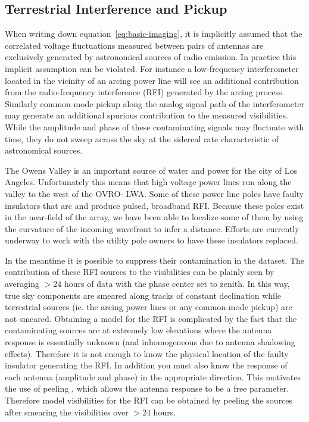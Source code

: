 \documentclass[twocolumn]{aastex6}
\begin{document}
\subsection{Terrestrial Interference and Pickup}

When writing down equation~\ref{eq:basic-imaging}, it is implicitly assumed that the correlated
voltage fluctuations measured between pairs of antennas are exclusively generated by astronomical
sources of radio emission. In practice this implicit assumption can be violated. For instance a
low-frequency interferometer located in the vicinity of an arcing power line will see an additional
contribution from the radio-frequency interference (RFI) generated by the arcing process. Similarly
common-mode pickup along the analog signal path of the interferometer may generate an additional
spurious contribution to the measured visibilities. While the amplitude and phase of these
contaminating signals may fluctuate with time, they do not sweep across the sky at the sidereal rate
characteristic of astronomical sources.

The Owens Valley is an important source of water and power for the city of Los Angeles.
Unfortunately this means that high voltage power lines run along the valley to the west of the OVRO-
LWA. Some of these power line poles have faulty insulators that arc and produce pulsed, broadband
RFI. Because these poles exist in the near-field of the array, we have been able to localize some of
them by using the curvature of the incoming wavefront to infer a distance. Efforts are currently
underway to work with the utility pole owners to have these insulators replaced.

In the meantime it is possible to suppress their contamination in the dataset. The contribution of
these RFI sources to the visibilities can be plainly seen by averaging $>24$ hours of data with the
phase center set to zenith. In this way, true sky components are smeared along tracks of constant
declination while terrestrial sources (ie. the arcing power lines or any common-mode pickup) are not
smeared.  Obtaining a model for the RFI is complicated by the fact that the contaminating sources
are at extremely low elevations where the antenna response is essentially unknown (and inhomogeneous
due to antenna shadowing effects). Therefore it is not enough to know the physical location of the
faulty insulator generating the RFI. In addition you must also know the response of each antenna
(amplitude and phase) in the appropriate direction. This motivates the use of peeling
\citep{2008ISTSP...2..707M, 2015MNRAS.449.2668S}, which allows the antenna response to be a free
parameter.  Therefore model visibilities for the RFI can be obtained by peeling the sources after
smearing the visibilities over $>24$ hours.
\end{document}
